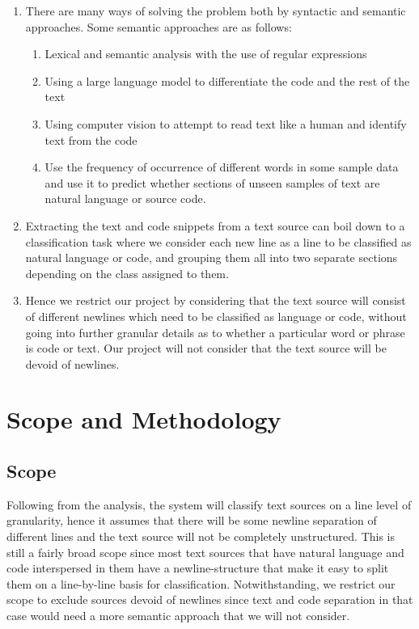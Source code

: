 \documentclass[12pt]{scrreprt}
\begin{document}
\begin{enumerate}
    \item There are many ways of solving the problem both by syntactic and semantic approaches. Some semantic approaches are as follows:
        \begin{enumerate}
            \item Lexical and semantic analysis with the use of regular expressions
            \item Using a large language model to differentiate the code and the rest of the text 
            \item Using computer vision to attempt to read text like a human and identify text from the code
            \item Use the frequency of occurrence of different words in some sample data and use it to predict whether sections of unseen samples of text are natural language or source code. 
        \end{enumerate}
    \item Extracting the text and code snippets from a text source can boil down to a classification task where we consider each new line as a line to be classified as natural language or code, and grouping them all into two separate sections depending on the class assigned to them.
    \item Hence we restrict our project by considering that the text source will consist of different newlines which need to be classified as language or code, without going into further granular details as to whether a particular word or phrase is code or text. Our project will not consider that the text source will be devoid of newlines.
    

\end{enumerate}






\chapter{Scope and Methodology}

\section{Scope}
Following from the analysis, the system will classify text sources on a line level of granularity, hence it assumes that there will be some newline separation of different lines and the text source will not be completely unstructured. This is still a fairly broad scope since most text sources that have natural language and code interspersed in them have a newline-structure that make it easy to split them on a line-by-line basis for classification. Notwithstanding, we restrict our scope to exclude sources devoid of newlines since text and code separation in that case would need a more semantic approach that we will not consider.
\end{document}
